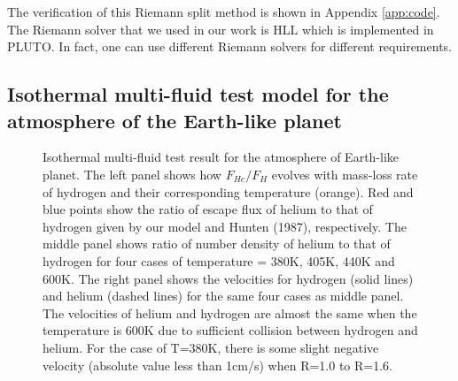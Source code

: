 \documentclass[journal, onecolumn]{aastex631}
\begin{document}
\begin{CJK*}{UTF8}{gbsn}
The verification of this Riemann split method is shown in Appendix \ref{app:code}. The Riemann solver that we used in our work is HLL which is implemented in PLUTO. In fact, one can use different Riemann solvers for different requirements.

\subsection{Isothermal multi-fluid test model for the atmosphere of the Earth-like planet}\label{subsec:iso_test}

\begin{figure}[ht!]
\caption{Isothermal multi-fluid test result for the atmosphere of Earth-like planet. The left panel shows how $F_{He}/F_{H}$ evolves with mass-loss rate of hydrogen and their corresponding temperature (orange). Red and blue points show the ratio of escape flux of helium to that of hydrogen given by our model and Hunten (1987), respectively. The middle panel shows ratio of number density of helium to that of hydrogen for four cases of temperature = 380K, 405K, 440K and 600K. The right panel shows the velocities for hydrogen (solid lines) and helium (dashed lines) for the same four cases as middle panel. The velocities of helium and hydrogen are almost the same when the temperature is 600K due to sufficient collision between hydrogen and helium. For the case of T=380K, there is some slight negative velocity (absolute value less than 1cm/s) when R=1.0 to R=1.6.}
\label{fig:iso_aly}
\end{figure}


\end{CJK*}
\end{document}
